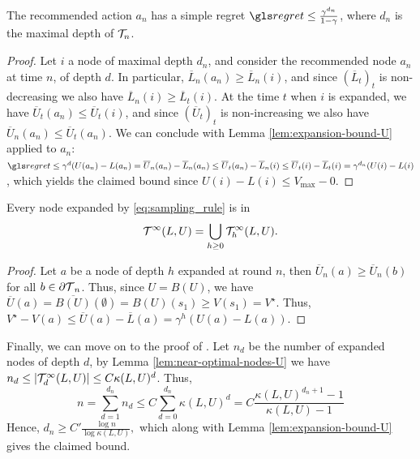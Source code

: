 \begin{subappendices}
\begin{lemma}[Recommendation]
\begin{leftbar}[lemmabar]
\label{lem:recommendation-bound-U}
The recommended action $a_n$ has a simple regret $\regret \leq \frac{\gamma^{d_n}}{1-\gamma}$, where $d_n$ is the maximal depth of $\mathcal{T}_n$.
\end{leftbar}
\end{lemma}
\begin{proof}
Let $i$ a node of maximal depth $d_n$, and consider the recommended node $a_n$ at time $n$, of depth $d$. In particular, $\overline{L}_n(a_n) \geq \overline{L}_n(i)$, and since $(\overline{L}_t)_t$ is non-decreasing we also have $\overline{L}_n(i) \geq \overline{L}_t(i)$. At the time $t$ when $i$ is expanded, we have $\overline{U}_t(a_n) \leq \overline{U}_t(i)$, and since $(\overline{U}_t)_t$ is non-increasing we also have $\overline{U}_n(a_n) \leq \overline{U}_t(a_n)$. We can conclude with Lemma \ref{lem:expansion-bound-U} applied to $a_n$: $\regret \leq \gamma^d(U(a_n)-L(a_n) = \overline{U}_n(a_n) - \overline{L}_n(a_n)  \leq \overline{U}_t(a_n) - \overline{L}_n(i) \leq \overline{U}_t(i) - \overline{L}_t(i) = \gamma^{d_n}(U(i) - L(i)$, which yields the claimed bound since $U(i) - L(i) \leq V_{\max}-0$.
\end{proof}

\begin{lemma}
\begin{leftbar}[lemmabar]
\label{lem:near-optimal-nodes-U}
Every node expanded by \eqref{eq:sampling_rule} is in $$\mathcal{T}^\infty(L,U) = \bigcup_{h\geq 0} \mathcal{T}^\infty_h(L,U).$$
\end{leftbar}
\end{lemma}
\begin{proof}
Let $a$ be a node of depth $h$ expanded at round $n$, then $\overline{U}_n(a) \geq \overline{U}_n(b)$ for all $b\in{\partial \mathcal{T}}_n$. Thus, since $U = B(U)$, we have $\overline{U}(a) = \overline{B(U)}(\emptyset) = B(U)(s_1) \geq V(s_1) = V^\star$. Thus, $V^\star - V(a) \leq \overline{U}(a) - \overline{L}(a) = \gamma^h(U(a) - L(a))$.
\end{proof}

Finally, we can move on to the proof of .
Let $n_d$ be the number of expanded nodes of depth $d$, by Lemma \ref{lem:near-optimal-nodes-U} we have $n_d \leq |\mathcal{T}^\infty_d(L,U)| \leq C\kappa(L,U)^d$. Thus, 
\[n = \sum_{d=1}^{d_n} n_d \leq C\sum_{d=0}^{d_n} \kappa(L,U)^d = C\frac{\kappa(L,U)^{d_n+1}-1}{\kappa(L,U)-1}\]
Hence, $d_n \geq C'\frac{\log n}{\log\kappa(L,U)},$ which along with Lemma \ref{lem:expansion-bound-U} gives the claimed bound.


\end{subappendices}
